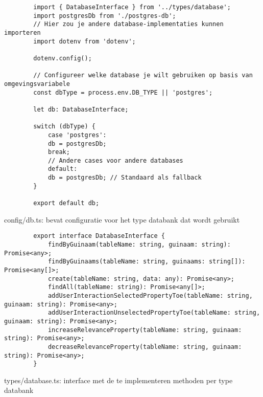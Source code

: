\begin{listing}
    \begin{verbatim}
        import { DatabaseInterface } from '../types/database';
        import postgresDb from './postgres-db';
        // Hier zou je andere database-implementaties kunnen importeren
        import dotenv from 'dotenv';
        
        dotenv.config();
        
        // Configureer welke database je wilt gebruiken op basis van omgevingsvariabele
        const dbType = process.env.DB_TYPE || 'postgres';
        
        let db: DatabaseInterface;
        
        switch (dbType) {
            case 'postgres':
            db = postgresDb;
            break;
            // Andere cases voor andere databases
            default:
            db = postgresDb; // Standaard als fallback
        }
        
        export default db;
    \end{verbatim}
    \caption{config/db.ts: bevat configuratie voor het type databank dat wordt gebruikt}
    \label{code:config/db}
\end{listing}

\begin{listing}
    \begin{verbatim}
        export interface DatabaseInterface {
            findByGuinaam(tableName: string, guinaam: string): Promise<any>;
            findByGuinaams(tableName: string, guinaams: string[]): Promise<any[]>;
            create(tableName: string, data: any): Promise<any>;
            findAll(tableName: string): Promise<any[]>;
            addUserInteractionSelectedPropertyToe(tableName: string, guinaam: string): Promise<any>;
            addUserInteractionUnselectedPropertyToe(tableName: string, guinaam: string): Promise<any>;
            increaseRelevanceProperty(tableName: string, guinaam: string): Promise<any>;
            decreaseRelevanceProperty(tableName: string, guinaam: string): Promise<any>;
        }
    \end{verbatim}
    \caption{types/database.ts: interface met de te implementeren methoden per type databank}
    \label{code:types/database}
\end{listing}

